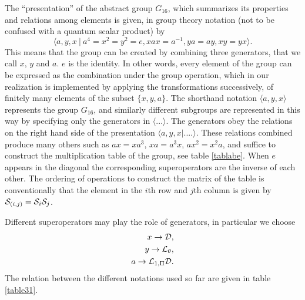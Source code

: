 {%

The ``presentation'' of the abstract group $G_{16}$, which summarizes its properties and relations among
elements is
given, in group theory notation (not to be confused with a quantum scalar product) by
%
\begin{equation}
\langle a,y,x \ | \ a^{4}=x^{2}=y^{2}=e,xax=a^{-1},ya=ay, xy=yx\rangle.
\label{18}
\end{equation}
%
This means that the group can be created by combining three generators, that we  call $x$, $y$ and $a$. $e$ is the identity. In other words,  every element of the group can be expressed as the combination under the group operation, which in our realization is implemented by applying the transformations successively,  of finitely many elements of the subset $\lbrace x,y,a\rbrace$.
The shorthand notation $\langle a,y,x\rangle$ represents the group $G_{16}$, and similarly
different subgroups are represented in this way by specifying only the generators in $\langle ...
\rangle$.
The generators obey the relations
on the right hand side of the presentation $\langle a,y,x|....\rangle$. These relations combined produce many others
such as $ax=xa^{3}$, $xa=a^3x$, $ax^2=x^2a$,
and suffice to construct the multiplication table of the group, see table \ref{tablabe}.
When $e$ appears in the diagonal the corresponding superoperators are the inverse of each other.
The ordering of
operations to construct the matrix of the table is
conventionally that the element in the $i$th row and $j$th column is given by ${\cal S}_{(i,j)}={\cal S}_i{\cal S}_j$.

Different superoperators may play the role of generators, in particular we choose
%
\begin{eqnarray}
x\rightarrow{\cal{D}},
\nonumber\\
y\rightarrow{\cal{L}}_{\theta},
\nonumber\\
a\rightarrow{\cal{L}}_{1,\Pi}{\cal{D}}.
\label{19}
\end{eqnarray}
%
The relation between the different notations used so far are
given in table \ref{table31}. %






}
